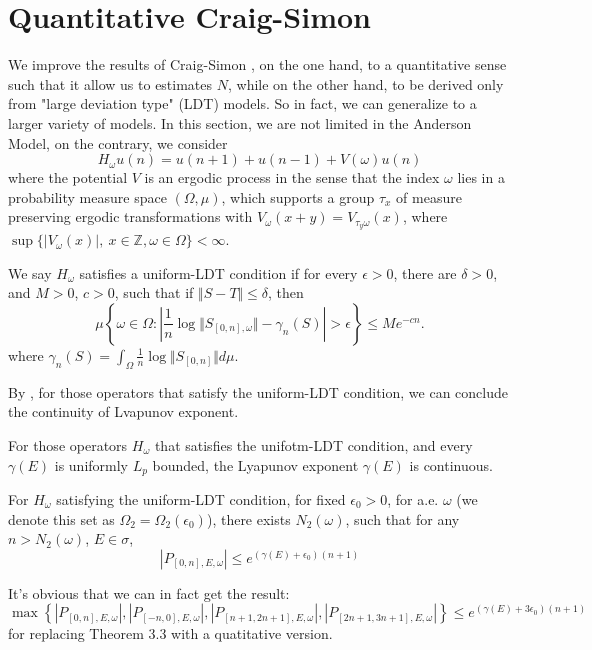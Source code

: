 \section{Quantitative Craig-Simon}
We improve the results of Craig-Simon \cite{craig1983subharmonicity}, on the one hand, to a quantitative sense such that it allow us to estimates $N$, while on the other hand, to be derived only from "large deviation type" (LDT) models. So in fact, we can generalize \cite{craig1983subharmonicity} to a larger variety of models. In this section, we are not limited in the Anderson Model, on the contrary, we consider
\[
 H_\omega u(n)=u(n+1)+u(n-1)+V(\omega)u(n)
\]
where the potential $V$ is an ergodic process in the sense that the index $\omega$ lies in a probability measure space $(\Omega,\mu)$, which supports a group $\tau_x$ of measure preserving ergodic transformations with $V_\omega(x+y)=V_{\tau_y\omega}(x)$, where $\sup\{|V_\omega(x)|,~x\in \mathbb{Z},\omega\in\Omega\}<\infty$.
\begin{definition}
  We say $H_\omega$ satisfies a uniform-LDT condition if for every $\epsilon>0$, there are $\delta>0$, and $M>0$, $c>0$, such that if $\Vert S-T\Vert\leq \delta$, then
  \[
  \mu\left\{\omega\in \Omega:|\frac{1}{n}\log\Vert S_{[0,n],\omega}\Vert-\gamma_n(S)|>\epsilon\right\}\leq Me^{-cn}.
  \]
  where $\gamma_n(S)=\int_{\Omega}\frac{1}{n}\log\Vert S_{[0,n]}\Vert d\mu$.
\end{definition}
By \cite{duarte2016lyapunov}, for those operators that satisfy the uniform-LDT condition, we can conclude the continuity of Lvapunov exponent.

\begin{thm}
  For those operators $H_\omega$ that satisfies the unifotm-LDT condition, and every $\gamma(E)$ is uniformly $L_p$ bounded, the Lyapunov exponent $\gamma(E)$ is continuous.
\end{thm}


\begin{thm}\label{QCS}
  For $H_\omega$ satisfying the uniform-LDT condition, for fixed $\epsilon_0>0$, for a.e. $\omega$ (we denote this set as $\Omega_2=\Omega_2(\epsilon_0)$), there exists $N_2(\omega)$, such that for any $n>N_2(\omega)$, $E\in \sigma$,
  \[
    |P_{[0,n],E,\omega}|\leq e^{(\gamma(E)+\epsilon_0)(n+1)}
  \]
\end{thm}
\begin{remark}
  It's obvious that we can in fact get the result:
  \[
  \max\left\{|P_{[0,n],E,\omega}|,|P_{[-n,0],E,\omega}|,|P_{[n+1,2n+1],E,\omega}|,|P_{[2n+1,3n+1],E,\omega}|\right\}\leq e^{(\gamma(E)+3\epsilon_0)(n+1)}
  \]
  for replacing Theorem 3.3 with a quatitative version.
\end{remark}

